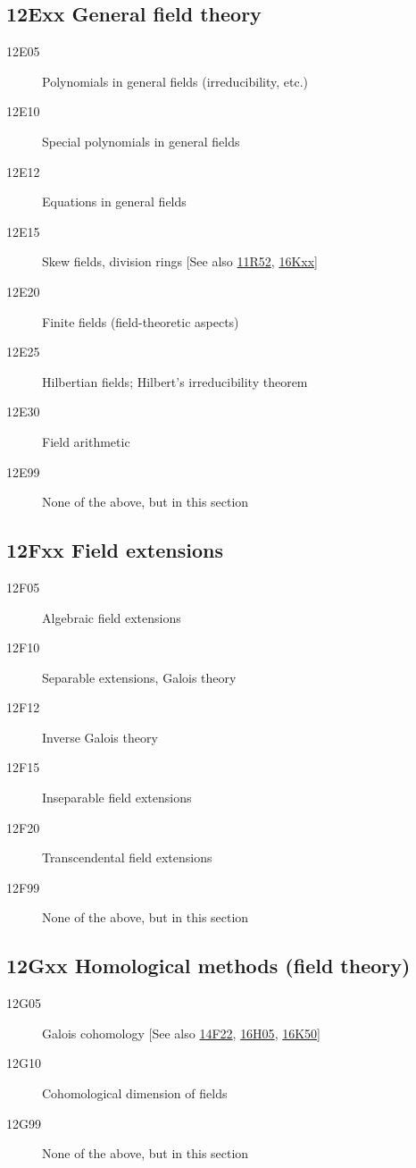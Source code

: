 \subsection*{12Exx  General field theory }\label{12Exx}
\begin{description}  
\item [12E05]\label{12E05} Polynomials in general fields (irreducibility, etc.)
\item [12E10]\label{12E10} Special polynomials in general fields
\item [12E12]\label{12E12} Equations in general fields
\item [12E15]\label{12E15} Skew fields, division rings [See also \hyperref[11R52]{11R52}, \hyperref[16Kxx]{16Kxx}]
\item [12E20]\label{12E20} Finite fields (field-theoretic aspects)
\item [12E25]\label{12E25} Hilbertian fields; Hilbert's irreducibility theorem
\item [12E30]\label{12E30} Field arithmetic
\item [12E99]\label{12E99} None of the above, but in this section
\end{description}
\subsection*{12Fxx  Field extensions }\label{12Fxx}
\begin{description}  
\item [12F05]\label{12F05} Algebraic field extensions
\item [12F10]\label{12F10} Separable extensions, Galois theory
\item [12F12]\label{12F12} Inverse Galois theory
\item [12F15]\label{12F15} Inseparable field extensions
\item [12F20]\label{12F20} Transcendental field extensions 
\item [12F99]\label{12F99} None of the above, but in this section
\end{description}
\subsection*{12Gxx  Homological methods (field theory) }\label{12Gxx}
\begin{description}  
\item [12G05]\label{12G05} Galois cohomology [See also \hyperref[14F22]{14F22}, \hyperref[16H05]{16H05}, \hyperref[16K50]{16K50}]
\item [12G10]\label{12G10} Cohomological dimension of fields
\item [12G99]\label{12G99} None of the above, but in this section
\end{description}
